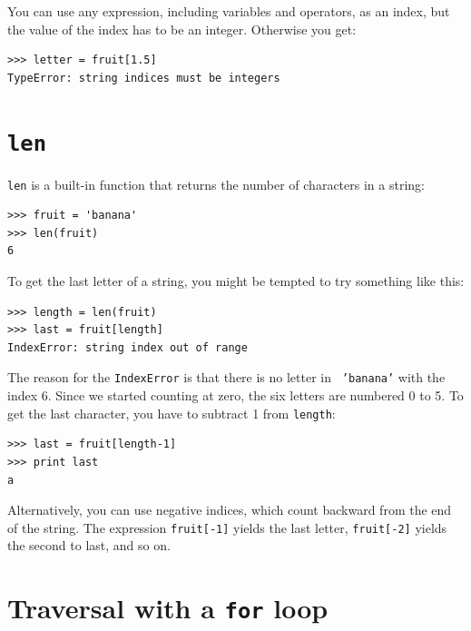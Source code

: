 \documentclass[10pt]{book}
\begin{document}

You can use any expression, including variables and operators, as an
index, but the value of the index has to be an integer.  Otherwise you
get:


\beforeverb
\begin{verbatim}
>>> letter = fruit[1.5]
TypeError: string indices must be integers
\end{verbatim}
\afterverb
%

\section{{\tt len}}


{\tt len} is a built-in function that returns the number of characters
in a string:

\beforeverb
\begin{verbatim}
>>> fruit = 'banana'
>>> len(fruit)
6
\end{verbatim}
\afterverb
%
To get the last letter of a string, you might be tempted to try something
like this:


\beforeverb
\begin{verbatim}
>>> length = len(fruit)
>>> last = fruit[length]
IndexError: string index out of range
\end{verbatim}
\afterverb
%
The reason for the {\tt IndexError} is that there is no letter in {\tt
'banana'} with the index 6.  Since we started counting at zero, the
six letters are numbered 0 to 5.  To get the last character, you have
to subtract 1 from {\tt length}:

\beforeverb
\begin{verbatim}
>>> last = fruit[length-1]
>>> print last
a
\end{verbatim}
\afterverb
%
Alternatively, you can use negative indices, which count backward from
the end of the string.  The expression {\tt fruit[-1]} yields the last
letter, {\tt fruit[-2]} yields the second to last, and so on.



\section{Traversal with a {\tt for} loop}
\label{for}
\end{document}
